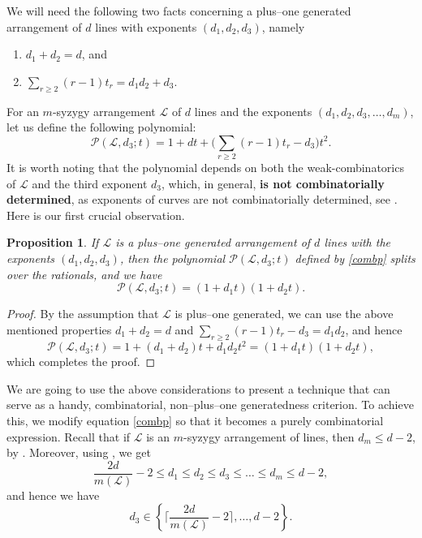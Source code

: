 \documentclass[12pt]{article}
\theoremstyle{plain}
\newtheorem{proposition}[thm]{Proposition}
\theoremstyle{definition}
\begin{document}
We will need the following two facts concerning a plus--one generated arrangement of $d$ lines with exponents $(d_{1}, d_{2}, d_{3})$, namely
\begin{enumerate}
    \item[a)] $d_{1}+d_{2}=d$, and
    \item[b)] $\sum_{r \geq 2}(r-1)t_{r} = d_{1}d_{2}+d_{3}.$
\end{enumerate}
For an $m$-syzygy arrangement $\mathcal{L}$ of $d$ lines and the exponents $(d_{1}, d_{2}, d_{3}, \ldots, d_{m})$, let us define the following polynomial:
\begin{equation}
\label{combp}
\mathcal{P}(\mathcal{L},d_{3};t) = 1 + dt + \bigg(\sum_{r\geq 2}(r-1)t_{r}-d_{3}\bigg)t^{2}.    
\end{equation}
It is worth noting that the polynomial depends on both the weak-combinatorics of $\mathcal{L}$ and the third exponent $d_{3}$, which, in general, \textbf{is not combinatorially determined}, as exponents of curves are not combinatorially determined, see \cite{CuntzPokora}.
Here is our first crucial observation.
\begin{proposition}
\label{cpog}
If $\mathcal{L}$ is a plus--one generated arrangement of $d$ lines with the exponents $(d_{1}, d_{2}, d_{3})$, then the polynomial $\mathcal{P}(\mathcal{L},d_{3};t)$ defined by \eqref{combp} splits over the rationals, and we have
$$\mathcal{P}(\mathcal{L},d_{3};t) = (1+d_{1}t)(1+d_{2}t).$$
\end{proposition}
\begin{proof}
By the assumption that $\mathcal{L}$ is plus--one generated, we can use the above mentioned properties $d_{1}+d_{2}=d$ and $\sum_{r\geq 2}(r-1)t_{r}-d_{3} = d_{1}d_{2}$, and hence
$$\mathcal{P}(\mathcal{L},d_{3};t) = 1 + (d_{1}+d_{2})t + d_{1}d_{2}t^{2} = (1+d_{1}t)(1+d_{2}t),$$
which completes the proof.
\end{proof}
We are going to use the above considerations to present a technique that can serve as a handy, combinatorial, non--plus--one generatedness criterion. To achieve this, we modify equation \eqref{combp} so that it becomes a purely combinatorial expression.
\noindent
Recall that if $\mathcal{L}$ is an $m$-syzygy arrangement of lines, then $d_m\leq d-2$, by \cite[Corollary 3.5]{Sch}. Moreover, using \cite[Theorem 2.1]{Dimca2}, we get
$$\frac{2d}{m(\mathcal{L})}-2 \leq d_{1} \leq d_{2} \leq d_{3} \leq \ldots \leq d_{m}\leq d-2,$$
and hence we have 
$$d_{3} \in \left\{ \bigg\lceil \frac{2d}{m(\mathcal{L})}-2 \bigg\rceil, \ldots , d-2\right\}.$$
\end{document}
